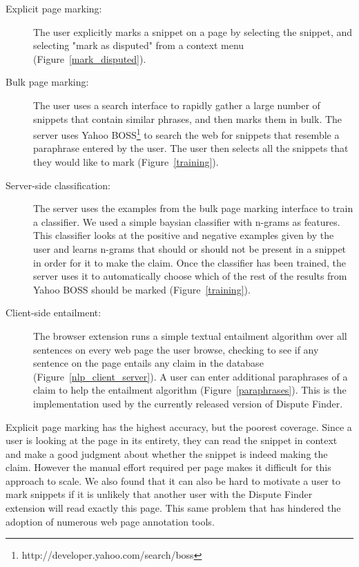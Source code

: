\documentclass{www2010-submission}
\newcommand{\todo}[1]{}
\begin{document}
\begin{description}
\item[Explicit page marking:] The user explicitly marks a snippet on a page by selecting the snippet, and selecting "mark as disputed" from a context menu (Figure~\ref{mark_disputed}).

\item[Bulk page marking:] The user uses a search interface to rapidly gather a large number of snippets that contain similar phrases, and then marks them in bulk. The server uses Yahoo BOSS\footnote{http://developer.yahoo.com/search/boss} to search the web for snippets that resemble a paraphrase entered by the user. The user then selects all the snippets that they would like to mark (Figure~\ref{training}).

\item[Server-side classification:] The server uses the examples from the bulk page marking interface to train a classifier. We used a simple baysian classifier with n-grams as features. This classifier looks at the positive and negative examples given by the user and learns n-grams that should or should not be present in a snippet in order for it to make the claim.  Once the classifier has been trained, the server uses it to automatically choose which of the rest of the results from Yahoo BOSS should be marked (Figure~\ref{training}).

\todo{Should we say that we didn't completely finish this version?}

\todo{Has anyone done something like this before.}
\todo{We only partially implemented this approach}

\item[Client-side entailment:] The browser extension runs a simple textual entailment algorithm over all sentences on every web page the user browse, checking to see if any sentence on the page entails any claim in the database (Figure~\ref{nlp_client_server}). A user can enter additional paraphrases of a claim to help the entailment algorithm (Figure~\ref{paraphrases}). This is the implementation used by the currently released version of Dispute Finder.
\end{description}

Explicit page marking has the highest accuracy, but the poorest coverage. Since a user is looking at the page in its entirety, they can read the snippet in context and make a good judgment about whether the snippet is indeed making the claim. However the manual effort required per page makes it difficult for this approach to scale. We also found that it can also be hard to motivate a user to mark snippets if it is unlikely that another user with the Dispute Finder extension will read exactly this page. This same problem that has hindered the adoption of numerous web page annotation tools.
\end{document}
